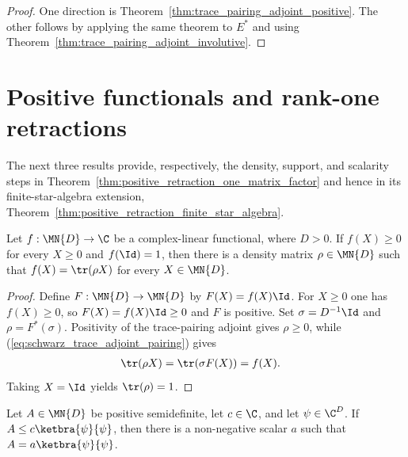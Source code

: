 \begin{proof}
    \leanok
    One direction is Theorem~\ref{thm:trace_pairing_adjoint_positive}. The
    other follows by applying the same theorem to $E^*$ and using
    Theorem~\ref{thm:trace_pairing_adjoint_involutive}.
\end{proof}

\section{Positive functionals and rank-one retractions}
\label{sec:app_schwarz_retractions}

The next three results provide, respectively, the density, support, and
scalarity steps in Theorem~\ref{thm:positive_retraction_one_matrix_factor} and
hence in its finite-star-algebra extension,
Theorem~\ref{thm:positive_retraction_finite_star_algebra}.

\begin{theorem}
    \label{thm:positive_functional_density_representation}
    \leanok
    Let $f : \MN{D} \to \C$ be a complex-linear functional, where $D>0$. If
    $f(X) \geq 0$ for every $X \geq 0$ and $f(\Id)=1$, then there is a density
    matrix $\rho \in \MN{D}$ such that
    $f(X) = \tr(\rho X)$ for every $X \in \MN{D}$.
\end{theorem}

\begin{proof}
    \leanok
    Define $F : \MN{D} \to \MN{D}$ by $F(X) = f(X)\Id$. For $X \geq 0$ one has
    $f(X) \geq 0$, so $F(X) = f(X)\Id \geq 0$ and $F$ is positive.
    Set $\sigma = D^{-1}\Id$ and $\rho = F^*(\sigma)$. Positivity of the
    trace-pairing adjoint gives $\rho \geq 0$, while
    (\ref{eq:schwarz_trace_adjoint_pairing}) gives
    \begin{align}
        \tr(\rho X)
         & =\tr(\sigma F(X))
        =f(X).
        \notag
    \end{align}
    Taking $X = \Id$ yields $\tr(\rho) = 1$.
\end{proof}

\begin{lemma}
    \label{lem:posSemidef_rankone_domination}
    \leanok
    Let $A\in\MN{D}$ be positive semidefinite, let $c\in\C$, and let
    $\psi\in\C^D$. If $A\leq c\ketbra{\psi}{\psi}$, then there is a
    non-negative scalar $a$ such that $A=a\ketbra{\psi}{\psi}$.
\end{lemma}

